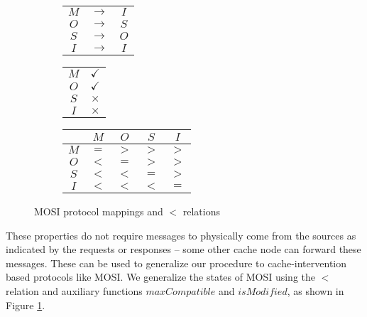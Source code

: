 \begin{figure}
\begin{subfigure}{.25\linewidth}
\centering
\begin{tabular}{|ccc|}
\hline
$M$ & $\rightarrow$ & $I$\\
$O$ & $\rightarrow$ & $S$\\
$S$ & $\rightarrow$ & $O$\\
$I$ & $\rightarrow$ & $I$\\
\hline
\end{tabular}
\end{subfigure}
\begin{subfigure}{.25\linewidth}
\centering
\begin{tabular}{|c|c|}
\hline
$M$ & $\checkmark$\\
$O$ & $\checkmark$\\
$S$ & $\times$\\
$I$ & $\times$\\
\hline
\end{tabular}
\end{subfigure}
\begin{subfigure}{.48\linewidth}
\centering
\begin{tabular}{|c|cccc|}
\hline
& $M$ & $O$ & $S$ & $I$\\
\hline
$M$ & $=$ & $>$ & $>$ & $>$\\
$O$ & $<$ & $=$ & $>$ & $>$\\
$S$ & $<$ & $<$ & $=$ & $>$\\
$I$ & $<$ & $<$ & $<$ & $=$\\
\hline
\end{tabular}
\end{subfigure}
\caption{MOSI protocol mappings and $<$ relations}
\label{mosi}
\end{figure}

These properties do not require messages to physically come from the sources as
indicated by the requests or responses -- some other cache node can forward
these messages. These can be used to generalize our procedure to
cache-intervention based protocols like MOSI. We generalize the states of MOSI
using the $<$ relation and auxiliary functions $maxCompatible$ and $isModified$,
as shown in Figure \ref{mosi}. 

